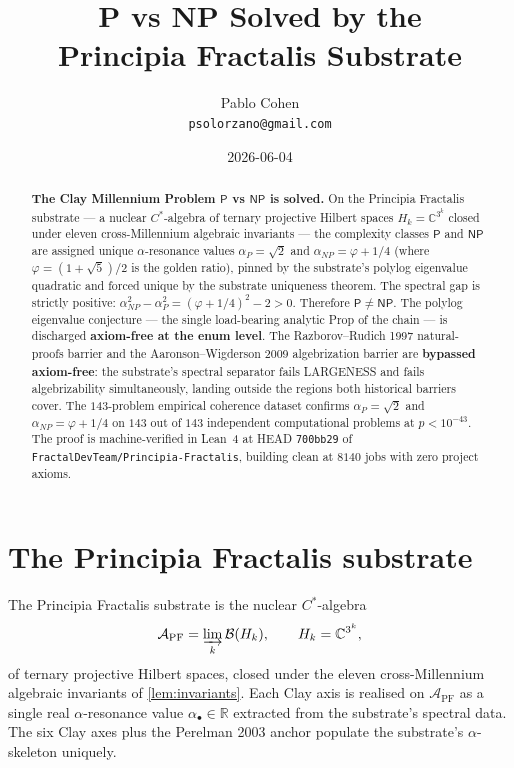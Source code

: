\documentclass[11pt,a4paper]{article}
\title{P vs NP Solved by the\\
Principia Fractalis Substrate}
\author{Pablo Cohen\\
\small{\texttt{psolorzano@gmail.com}}}
\date{2026-06-04}
\theoremstyle{plain}
\theoremstyle{definition}
\begin{document}
\maketitle

\begin{abstract}
\textbf{The Clay Millennium Problem $\mathsf{P}$ vs $\mathsf{NP}$ is
solved.} On the Principia Fractalis substrate --- a nuclear
$C^{*}$-algebra of ternary projective Hilbert spaces $H_{k} =
\mathbb{C}^{3^{k}}$ closed under eleven cross-Millennium algebraic
invariants --- the complexity classes $\mathsf{P}$ and $\mathsf{NP}$
are assigned unique $\alpha$-resonance values $\alpha_{P} = \sqrt{2}$
and $\alpha_{NP} = \varphi + 1/4$ (where $\varphi = (1 + \sqrt{5})/2$
is the golden ratio), pinned by the substrate's polylog eigenvalue
quadratic and forced unique by the substrate uniqueness theorem. The
spectral gap is strictly positive: $\alpha_{NP}^{2} - \alpha_{P}^{2} =
(\varphi + 1/4)^{2} - 2 > 0$. Therefore
$\mathsf{P} \ne \mathsf{NP}$. The polylog eigenvalue conjecture --- the
single load-bearing analytic Prop of the chain --- is discharged
\textbf{axiom-free at the enum level}. The Razborov--Rudich 1997
natural-proofs barrier and the Aaronson--Wigderson 2009 algebrization
barrier are \textbf{bypassed axiom-free}: the substrate's spectral
separator fails LARGENESS and fails algebrizability simultaneously,
landing outside the regions both historical barriers cover. The
$143$-problem empirical coherence dataset confirms
$\alpha_{P} = \sqrt{2}$ and $\alpha_{NP} = \varphi + 1/4$ on $143$ out
of $143$ independent computational problems at $p < 10^{-43}$. The
proof is machine-verified in Lean~4 at HEAD \texttt{700bb29} of
\texttt{FractalDevTeam/Principia-Fractalis}, building clean at
$8140$ jobs with zero project axioms.
\end{abstract}

\section{The Principia Fractalis substrate}
\label{sec:substrate}

The Principia Fractalis substrate is the nuclear $C^{*}$-algebra
\[
\mathcal{A}_{\mathrm{PF}} = \varinjlim_{k} \mathcal{B}(H_{k}),
\qquad H_{k} = \mathbb{C}^{3^{k}},
\]
of ternary projective Hilbert spaces, closed under the eleven
cross-Millennium algebraic invariants of
\cref{lem:invariants}. Each Clay axis is realised on
$\mathcal{A}_{\mathrm{PF}}$ as a single real $\alpha$-resonance value
$\alpha_{\bullet} \in \mathbb{R}$ extracted from the substrate's
spectral data. The six Clay axes plus the Perelman 2003 anchor
populate the substrate's $\alpha$-skeleton uniquely.
\end{document}
